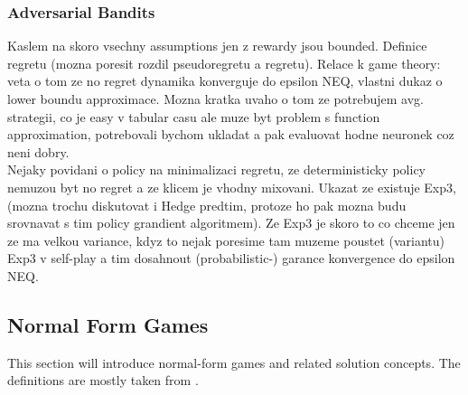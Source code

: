 \documentclass{article}
\theoremstyle{remark}
\theoremstyle{definition}
\begin{document}
\subsubsection{Adversarial Bandits}
Kaslem na skoro vsechny assumptions jen z rewardy jsou bounded.  Definice regretu (mozna poresit rozdil pseudoregretu a regretu). Relace k game theory: veta o tom ze no regret dynamika konverguje do epsilon NEQ, vlastni dukaz o lower boundu approximace. Mozna kratka uvaho o tom ze potrebujem avg. strategii, co je easy v tabular casu ale muze byt problem s function approximation, potrebovali bychom ukladat a pak evaluovat hodne neuronek coz neni dobry. \\
Nejaky povidani o policy na minimalizaci regretu, ze deterministicky policy nemuzou byt no regret a ze klicem je vhodny mixovani. Ukazat ze existuje Exp3, (mozna trochu diskutovat i Hedge predtim, protoze ho pak mozna budu srovnavat s tim policy grandient algoritmem). Ze Exp3 je skoro to co chceme jen ze ma velkou variance, kdyz to nejak poresime tam muzeme poustet (variantu) Exp3 v self-play a tim dosahnout (probabilistic-) garance konvergence do epsilon NEQ.

\subsection{Normal Form Games}
This section will introduce normal-form games and related solution concepts. The definitions are mostly taken from \cite{mas}.
\end{document}
